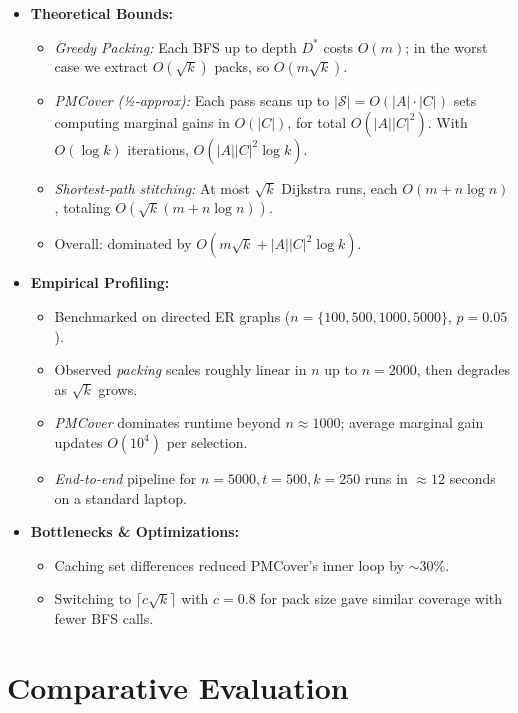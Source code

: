\documentclass[11pt]{article}
\begin{document}
\begin{itemize}
  \item \textbf{Theoretical Bounds:}
    \begin{itemize}
      \item \emph{Greedy Packing:} Each BFS up to depth \(D^*\) costs \(O(m)\); in the worst case we extract \(O(\sqrt{k})\) packs, so \(O(m\sqrt{k})\).
      \item \emph{PMCover (½-approx):} Each pass scans up to \(|\mathcal{S}|=O(|A|\cdot|C|)\) sets computing marginal gains in \(O(|C|)\), for total \(O(|A||C|^2)\). With \(O(\log k)\) iterations, \(O(|A||C|^2\log k)\).
      \item \emph{Shortest-path stitching:} At most \(\sqrt{k}\) Dijkstra runs, each \(O(m + n\log n)\), totaling \(O(\sqrt{k}(m + n\log n))\).
      \item Overall: dominated by \(O(m\sqrt{k} + |A||C|^2\log k)\).
    \end{itemize}

  \item \textbf{Empirical Profiling:}
    \begin{itemize}
      \item Benchmarked on directed ER graphs (\(n=\{100,500,1000,5000\}\), \(p=0.05\)).
      \item Observed \emph{packing} scales roughly linear in \(n\) up to \(n=2000\), then degrades as \(\sqrt{k}\) grows.
      \item \emph{PMCover} dominates runtime beyond \(n\approx1000\); average marginal gain updates \(O(10^4)\) per selection.
      \item \emph{End-to-end} pipeline for \(n=5000, t=500, k=250\) runs in \(\approx 12\) seconds on a standard laptop.
    \end{itemize}

  \item \textbf{Bottlenecks \& Optimizations:}
    \begin{itemize}
      \item Caching set differences reduced PMCover’s inner loop by \(\sim\!30\%\).
      \item Switching to \(\lceil c\sqrt{k}\rceil\) with \(c=0.8\) for pack size gave similar coverage with fewer BFS calls.
    \end{itemize}
\end{itemize}
\section{Comparative Evaluation}
\end{document}
